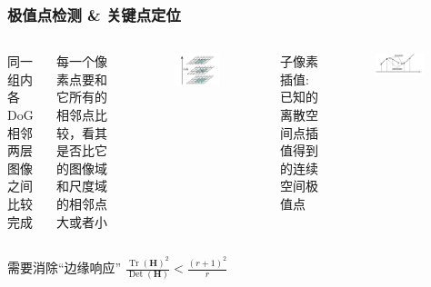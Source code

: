 \documentclass[presentation,aspectratio=1610]{beamer}
\begin{document}
\begin{frame}
	\frametitle{极值点检测 \& 关键点定位}
	\begin{columns}
		同一组内各DoG相邻两层图像之间比较完成
		
	每一个像素点要和它所有的相邻点比较，看其是否比它的图像域和尺度域的相邻点大或者小\\
	\begin{figure}[htbp!]
		\centering
		\includegraphics[width=0.9\textwidth]{img/zreo.jpg}
	\end{figure}			
		
		子像素插值:已知的离散空间点插值得到的连续空间极值点\\
		
	\begin{figure}[htbp!]
		\centering
		\includegraphics[width=0.9\textwidth]{img/zeros.jpg}
	\end{figure}

\end{columns}

\centering 需要消除“边缘响应”  \quad $\frac{\operatorname{Tr}(\mathbf{H})^{2}}{\operatorname{Det}(\mathbf{H})}<\frac{(r+1)^{2}}{r}$

\end{frame}
\end{document}
